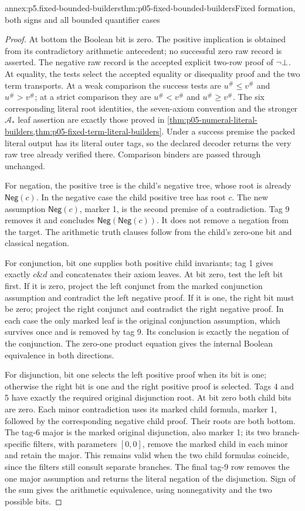 \begin{annexitem}{annex:p5.fixed-bounded-builders}{thm:p05-fixed-bounded-builders}{Fixed formation, both signs and all bounded quantifier cases}
\begin{proof}
At bottom the Boolean bit is zero. The positive implication is obtained
from its contradictory arithmetic antecedent; no successful zero raw
record is asserted. The negative raw record is the accepted explicit
two-row proof of \(\neg\bot\). At equality, the tests select
the accepted equality or disequality proof and the two term transports.
At a weak comparison the success tests are \(u^\#\leq v^\#\)
and \(u^\#>v^\#\); at a strict comparison they are
\(u^\#<v^\#\) and \(u^\#\geq v^\#\). The six corresponding
literal root identities, the seven-axiom convention and the stronger
\(\mathcal A_*\) leaf assertion are exactly those proved in
\cref{thm:p05-numeral-literal-builders,thm:p05-fixed-term-literal-builders}.
Under a success premise the packed literal output has its literal
outer tags, so the declared decoder returns the very raw tree already
verified there. Comparison binders are passed through unchanged.

For negation, the positive tree is the child's negative tree, whose
root is already \(\mathsf{Neg}(c)\). In the negative case the child
positive tree has root \(c\). The new assumption
\(\mathsf{Neg}(c)\), marker 1, is the second premise of a
contradiction. Tag 9 removes it and concludes
\(\mathsf{Neg}(\mathsf{Neg}(c))\). It does not remove a negation
from the target. The arithmetic truth clauses follow from the child's
zero-one bit and classical negation.

For conjunction, bit one supplies both positive child invariants; tag 1
gives exactly \(c\mathbin{\&}d\) and concatenates their axiom
leaves. At bit zero, test the left bit first. If it is zero, project
the left conjunct from the marked conjunction assumption and contradict
the left negative proof. If it is one, the right bit must be zero;
project the right conjunct and contradict the right negative proof.
In each case the only marked leaf is the original conjunction assumption,
which survives once and is removed by tag 9. Its conclusion is exactly
the negation of the conjunction. The zero-one product equation gives
the internal Boolean equivalence in both directions.

For disjunction, bit one selects the left positive proof when its bit
is one; otherwise the right bit is one and the right positive proof
is selected. Tags 4 and 5 have exactly the required original disjunction
root. At bit zero both child bits are zero. Each minor contradiction
uses its marked child formula, marker 1, followed by the corresponding
negative child proof. Their roots are both bottom. The tag-6 major is
the marked original disjunction, also marker 1; its two branch-specific
filters, with parameters \([0,0]\), remove the marked child in
each minor and retain the major. This remains valid when the two child
formulas coincide, since the filters still consult separate branches.
The final tag-9 row removes the one major assumption and returns the
literal negation of the disjunction. Sign of the sum gives the
arithmetic equivalence, using nonnegativity and the two possible bits.


\end{proof}
\end{annexitem}
